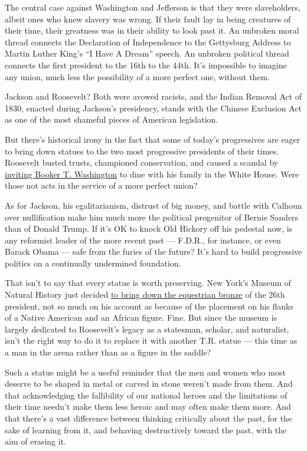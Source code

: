 The central case against Washington and Jefferson is that they were
slaveholders, albeit ones who knew slavery was wrong. If their fault lay
in being creatures of their time, their greatness was in their ability
to look past it. An unbroken moral thread connects the Declaration of
Independence to the Gettysburg Address to Martin Luther King's ``I Have
A Dream'' speech. An unbroken political thread connects the first
president to the 16th to the 44th. It's impossible to imagine any union,
much less the possibility of a more perfect one, without them.

Jackson and Roosevelt? Both were avowed racists, and the Indian Removal
Act of 1830, enacted during Jackson's presidency, stands with the
Chinese Exclusion Act as one of the most shameful pieces of American
legislation.

But there's historical irony in the fact that some of today's
progressives are eager to bring down statues to the two most progressive
presidents of their times. Roosevelt busted trusts, championed
conservation, and caused a scandal by
\href{https://www.npr.org/2012/05/14/152684575/teddy-roosevelts-shocking-dinner-with-washington}{inviting
Booker T. Washington} to dine with his family in the White House. Were
those not acts in the service of a more perfect union?

As for Jackson, his egalitarianism, distrust of big money, and battle
with Calhoun over nullification make him much more the political
progenitor of Bernie Sanders than of Donald Trump. If it's OK to knock
Old Hickory off his pedestal now, is any reformist leader of the more
recent past --- F.D.R., for instance, or even Barack Obama --- safe from
the furies of the future? It's hard to build progressive politics on a
continually undermined foundation.

That isn't to say that every statue is worth preserving. New York's
Museum of Natural History just decided
\href{https://www.nytimes.com/2020/06/21/arts/design/roosevelt-statue-to-be-removed-from-museum-of-natural-history.html}{to
bring down the equestrian bronze} of the 26th president, not so much on
his account as because of the placement on his flanks of a Native
American and an African figure. Fine. But since the museum is largely
dedicated to Roosevelt's legacy as a statesman, scholar, and naturalist,
isn't the right way to do it to replace it with another T.R. statue ---
this time as a man in the arena rather than as a figure in the saddle?

Such a statue might be a useful reminder that the men and women who most
deserve to be shaped in metal or carved in stone weren't made from them.
And that acknowledging the fallibility of our national heroes and the
limitations of their time needn't make them less heroic and may often
make them more. And that there's a vast difference between thinking
critically about the past, for the sake of learning from it, and
behaving destructively toward the past, with the aim of erasing it.

